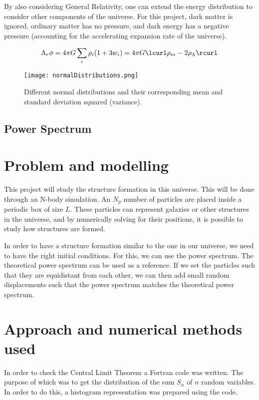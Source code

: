 \documentclass[12pt]{article}
\begin{document}
By also considering General Relativity, one can extend the energy distribution to consider other components of the universe. For this project, dark matter is ignored, ordinary matter has no pressure, and dark energy has a negative pressure (accounting for the accelerating expansion rate of the universe).

\begin{equation}
\Lambda_{r} \phi = 4 \pi G \sum_{i} \rho_{i} (1 + 3w_{i}) = 4 \pi G \lcurl \rho_{m} - 2 \rho_{\Lambda} \rcurl
\end{equation}


\begin{figure}[H]
	\centering
	\texttt{[image: normalDistributions.png]}
	\caption{Different normal distributions and their corresponding mean and standard deviation squared (variance)\cite{ref:normalWiki}.}
	\label{ref:normalCurve}
\end{figure}

\subsection*{Power Spectrum}



\section*{Problem and modelling}
This project will study the structure formation in this universe. This will be done through an N-body simulation. An $N_{p}$ number of particles are placed inside a periodic box of size $L$. These particles can represent galaxies or other structures in the universe, and by numerically solving for their positions, it is possible to study how structures are formed.

In order to have a structure formation similar to the one in our universe, we need to have the right initial conditions. For this, we can use the power spectrum. The theoretical power spectrum can be used as a reference. If we set the particles such that they are equidistant from each other, we can then add small random displacements such that the power spectrum matches the theoretical power spectrum.


\section*{Approach and numerical methods used}
In order to check the Central Limit Theorem a Fortran code was written. The purpose of which was to get the distribution of the sum $S_{n}$ of $n$ random variables. In order to do this, a histogram representation was prepared using the code.
\end{document}
